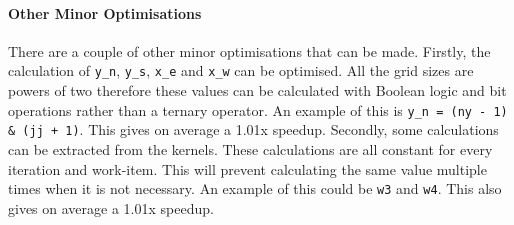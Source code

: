 


\paragraph{Other Minor Optimisations}
There are a couple of other minor optimisations that can be made. Firstly, the calculation of \texttt{y\_n}, \texttt{y\_s}, \texttt{x\_e} and \texttt{x\_w} can be optimised. All the grid sizes are powers of two therefore these values can be calculated with Boolean logic and bit operations rather than a ternary operator. An example of this is \texttt{y\_n = (ny - 1) \& (jj + 1)}. This gives on average a 1.01x speedup. Secondly, some calculations can be extracted from the kernels. These calculations are all constant for every iteration and work-item. This will prevent calculating the same value multiple times when it is not necessary. An example of this could be \texttt{w3} and \texttt{w4}. This also gives on average a 1.01x speedup.